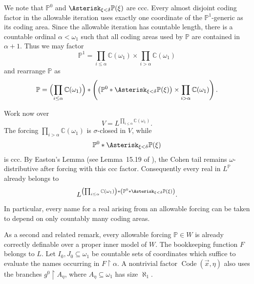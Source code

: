 \documentclass[a4paper,11pt]{article}
\newcommand{\forceP}{\mathbb{P}}
\begin{document}
We note that $\forceP^0$ and $\Asterisk_{\xi<\delta}\forceP(\xi)$ are ccc. Every almost disjoint coding factor in the allowable iteration uses exactly one coordinate of the $\forceP^1$-generic as its coding area. Since the allowable iteration has countable length, there is a countable ordinal $\alpha<\omega_1$ such that all coding areas used by $\forceP$ are contained in $\alpha+1$. Thus we may factor
\[
\forceP^1=
\prod_{i\leq\alpha}\mathbb C(\omega_1)
\times
\prod_{i>\alpha}\mathbb C(\omega_1)
\]
and rearrange $\forceP$ as
\[
\forceP=
\Bigl(\prod_{i\leq\alpha}\mathbb C(\omega_1)\Bigr)
\ast
\left(
  \left(\forceP^0\ast
  \Asterisk_{\xi<\delta}\forceP(\xi)\right)
  \times
  \prod_{i>\alpha}\mathbb C(\omega_1)
\right).
\]

Work now over
\[
V=L^{\prod_{i\leq\alpha}\mathbb C(\omega_1)}.
\]
The forcing $\prod_{i>\alpha}\mathbb C(\omega_1)$ is $\sigma$-closed in $V$, while
\[
\forceP^0\ast\Asterisk_{\xi<\delta}\forceP(\xi)
\]
is ccc. By Easton's Lemma (see Lemma~15.19 of \cite{Jech}), the Cohen tail remains $\omega$-distributive after forcing with this ccc factor. Consequently every real in $L^{\forceP}$ already belongs to
\[
L^{\left(\prod_{i\leq\alpha}\mathbb C(\omega_1)\right)
  \ast\left(\forceP^0\ast\Asterisk_{\xi<\delta}\forceP(\xi)\right)}.
\]
In particular, every name for a real arising from an allowable forcing can be taken to depend on only countably many coding areas.

As a second and related remark, every allowable forcing $\forceP\in W$ is already correctly definable over a proper inner model of $W$. The bookkeeping function $F$ belongs to $L$. Let $I_0,J_0\subseteq\omega_1$ be countable sets of coordinates which suffice to evaluate the names occurring in $F\upharpoonright\alpha$. A nontrivial factor $\operatorname{Code}(\vec x,\eta)$ also uses the branches $g^0\upharpoonright A_\eta$, where $A_\eta\subseteq\omega_1$ has size $\aleph_1$.
\end{document}
